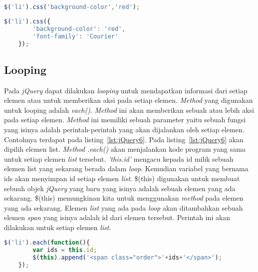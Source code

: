 \begin{lstlisting}[language=Javascript, caption=Mengubah warna background color semua elemen list, label={lst:jQuery8}]
	$('li').css('background-color','red');
\end{lstlisting}

\begin{lstlisting}[language=Javascript, caption=Mengubah warna background color dan jenis font untuk semua elemen list, label={lst:jQuery9}]
	$('li').css({
		'background-color': 'red',
		'font-family': 'Courier'
	});
\end{lstlisting}

\subsection{Looping}
Pada \textit{jQuery} dapat dilakukan \textit{looping} untuk mendapatkan informasi dari setiap elemen atau untuk memberikan aksi pada setiap elemen. \textit{Method} yang digunakan untuk looping adalah \textit{each()}. \textit{Method} ini akan memberikan sebuah atau lebih aksi pada setiap elemen. \textit{Method} ini memiliki sebuah parameter yaitu sebuah fungsi yang isinya adalah perintah-perintah yang akan dijalankan oleh setiap elemen. Contohnya terdapat pada listing~\ref{lst:jQuery6}. Pada listing~\ref{lst:jQuery6} akan dipilih elemen list. \textit{Method .each()} akan menjalankan kode program yang sama untuk setiap elemen \textit{list} tersebut. \textit{'this.id'} mengacu kepada id milik sebuah elemen list yang sekarang berada dalam \textit{loop}. Kemudian variabel yang bernama ids akan menyimpan id setiap elemen \textit{list}. \$(this) digunakan untuk membuat sebuah objek \textit{jQuery} yang baru yang isinya adalah sebuah elemen yang ada sekarang. \$(this) memungkinan kita untuk menggunakan \textit{method} pada elemen yang ada sekarang. Elemen \textit{list} yang ada pada \textit{loop} akan ditambahkan sebuah elemen \textit{span} yang isinya adalah id dari elemen tersebut. Perintah ini akan dilakukan untuk setiap elemen \textit{list}.

\begin{lstlisting}[language=Javascript, caption=Menambah setiap elemen list dengan id list masing-masing , label={lst:jQuery6}]
	$('li').each(function(){
		var ids = this.id;
		$(this).append('<span class="order">'+ids+'</span>');
	});
\end{lstlisting}

